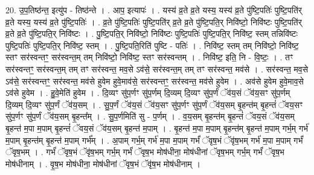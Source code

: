 \documentclass[17pt]{extarticle}
\begin{document}
20. उ॒प॒तिष्ठ॑न्त॒ इत्यु॑प - तिष्ठ॑न्ते । . आप॒ इत्यापः॑ । . यस्य॑ व्र॒ते व्र॒ते यस्य॒ यस्य॑ व्र॒ते पु॑ष्टि॒पतिः॑ पुष्टि॒पति॑र् व्र॒ते यस्य॒ यस्य॑ व्र॒ते पु॑ष्टि॒पतिः॑ । . व्र॒ते पु॑ष्टि॒पतिः॑ पुष्टि॒पति॑र् व्र॒ते व्र॒ते पु॑ष्टि॒पति॒र् निवि॑ष्टो॒ निवि॑ष्टः पुष्टि॒पति॑र् व्र॒ते व्र॒ते पु॑ष्टि॒पति॒र् निवि॑ष्टः । . पु॒ष्टि॒पति॒र् निवि॑ष्टो॒ निवि॑ष्टः पुष्टि॒पतिः॑ पुष्टि॒पति॒र् निवि॑ष्ट॒ स्तम् तन्निवि॑ष्टः पुष्टि॒पतिः॑ पुष्टि॒पति॒र् निवि॑ष्ट॒ स्तम् । . पु॒ष्टि॒पति॒रिति॑ पुष्टि - पतिः॑ । . निवि॑ष्ट॒ स्तम् तम् निवि॑ष्टो॒ निवि॑ष्ट॒ स्तꣳ सर॑स्वन्तꣳ॒॒ सर॑स्वन्त॒म् तम् निवि॑ष्टो॒ निवि॑ष्ट॒ स्तꣳ सर॑स्वन्तम् । . निवि॑ष्ट॒ इति॒ नि - वि॒ष्टः॒ । . तꣳ सर॑स्वन्तꣳ॒॒ सर॑स्वन्त॒म् तम् तꣳ सर॑स्वन्त॒ मव॒से ऽव॑से॒ सर॑स्वन्त॒म् तम् तꣳ सर॑स्वन्त॒ मव॑से । . सर॑स्वन्त॒ मव॒से ऽव॑से॒ सर॑स्वन्तꣳ॒॒ सर॑स्वन्त॒ मव॑से हुवेम हुवे॒माव॑से॒ सर॑स्वन्तꣳ॒॒ सर॑स्वन्त॒ मव॑से हुवेम । . अव॑से हुवेम हुवे॒माव॒से ऽव॑से हुवेम । . हु॒वे॒मेति॑ हुवेम । . दि॒व्यꣳ सु॑प॒र्णꣳ सु॑प॒र्णम् दि॒व्यम् दि॒व्यꣳ सु॑प॒र्णं ॅव॑य॒सं ॅव॑य॒सꣳ सु॑प॒र्णम् दि॒व्यम् दि॒व्यꣳ सु॑प॒र्णं ॅव॑य॒सम् । . सु॒प॒र्णं ॅव॑य॒सं ॅव॑य॒सꣳ सु॑प॒र्णꣳ सु॑प॒र्णं ॅव॑य॒सम् बृ॒हन्त॑म् बृ॒हन्तं॑ ॅवय॒सꣳ सु॑प॒र्णꣳ सु॑प॒र्णं ॅव॑य॒सम् बृ॒हन्त᳚म् । . सु॒प॒र्णमिति॑ सु - प॒र्णम् । . व॒य॒सम् बृ॒हन्त॑म् बृ॒हन्तं॑ ॅवय॒सं ॅव॑य॒सम् बृ॒हन्त॑ म॒पा म॒पाम् बृ॒हन्तं॑ ॅवय॒सं ॅव॑य॒सम् बृ॒हन्त॑ म॒पाम् । . बृ॒हन्त॑ म॒पा म॒पाम् बृ॒हन्त॑म् बृ॒हन्त॑ म॒पाम् गर्भ॒म् गर्भ॑ म॒पाम् बृ॒हन्त॑म् बृ॒हन्त॑ म॒पाम् गर्भ᳚म् । . अ॒पाम् गर्भ॒म् गर्भ॑ म॒पा म॒पाम् गर्भं॑ ॅवृष॒भं ॅवृ॑ष॒भम् गर्भ॑ म॒पा म॒पाम् गर्भं॑ ॅवृष॒भम् । . गर्भं॑ ॅवृष॒भं ॅवृ॑ष॒भम् गर्भ॒म् गर्भं॑ ॅवृष॒भ मोष॑धीना॒ मोष॑धीनां ॅवृष॒भम् गर्भ॒म् गर्भं॑ ॅवृष॒भ मोष॑धीनाम् । . वृ॒ष॒भ मोष॑धीना॒ मोष॑धीनां ॅवृष॒भं ॅवृ॑ष॒भ मोष॑धीनाम् । \newline
\end{document}
